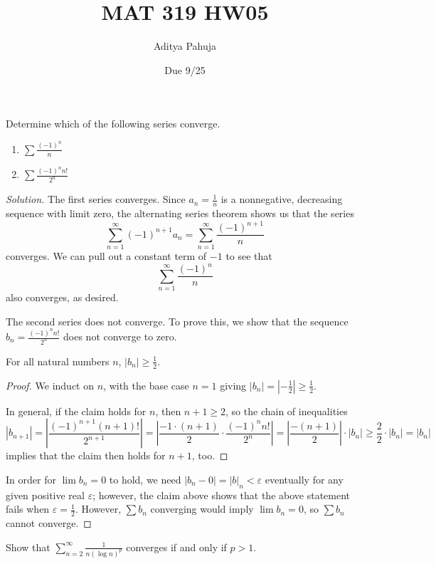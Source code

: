 \documentclass[11pt]{scrartcl}
\title{\vspace{-2em}MAT 319 HW05}
\author{\large Aditya Pahuja}
\date{\large Due 9/25}
\providecommand{\eps}{\varepsilon}
\providecommand{\half}{\frac{1}{2}}
\providecommand{\ii}{\item}
\theoremstyle{problem}
\newenvironment{problem}[1]
{\renewcommand\theinnercustomthm{#1}\innercustomthm}
{\endinnercustomthm}
\theoremstyle{remark}
\newenvironment{soln}{\begin{proof}[Solution]}{\end{proof}}
\providecommand{\abs}[1]{\left|#1\right|}
\begin{document}
\maketitle

\begin{problem}{15.1}
	Determine which of the following series converge.
	\begin{enumerate}[\emph{\textbf{(\alph*)}}]
		\ii $\sum \frac{(-1)^n}{n}$
		\ii $\sum \frac{(-1)^nn!}{2^n}$
	\end{enumerate}
\end{problem}

\begin{soln}
	The first series converges. Since $a_n =\frac 1n$ is a nonnegative,
	decreasing sequence with limit zero, the alternating series theorem
	shows us that the series
	\[\sum_{n=1}^\infty (-1)^{n+1}a_n = \sum_{n=1}^\infty\frac{(-1)^{n+1}}{n}\]
	converges. We can pull out a constant term of $-1$ to see that
	\[\sum_{n=1}^\infty \frac{(-1)^n}{n}\]
	also converges, as desired.
	
	The second series does not converge. To prove this, we show that
	the sequence $b_n = \frac{(-1)^nn!}{2^n}$ does not converge to zero.
	\begin{claim*}
		For all natural numbers $n$, $|b_n| \ge \half$.
	\end{claim*}
	\begin{proof}
		We induct on $n$, with the base case $n = 1$ giving
		$|b_n| = |-\half| \ge \half$.
		
		In general, if the claim holds for $n$, then $n + 1 \ge 2$, so
		the chain of inequalities
		\[|b_{n+1}| = \abs{\frac{(-1)^{n+1}(n+1)!}{2^{n+1}}}
		= \abs{\frac{-1\cdot(n+1)}{2}\cdot \frac{(-1)^nn!}{2^n}}
		= \abs{\frac{-(n+1)}{2}}\cdot \abs{b_n} \ge \frac 22\cdot\abs {b_n}
		= \abs{b_n}\]
		implies that the claim then holds for $n+1$, too.
	\end{proof}
	
	In order for $\lim b_n = 0$ to hold, we need
	$\abs{b_n - 0} = \abs b_n < \eps$ eventually
	for any given positive real $\eps$; however, the claim above shows that
	the above statement fails when $\eps = \half$.
	However, $\sum b_n$ converging would imply $\lim b_n = 0$,
	so $\sum b_n$ cannot converge.
\end{soln}

\pagebreak
\begin{problem}{15.3}
	Show that $\sum_{n=2}^\infty \frac{1}{n(\log n)^p}$ converges
	if and only if $p > 1$.
\end{problem}
\end{document}

